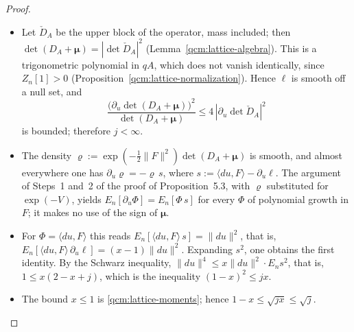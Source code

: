 \documentclass[11pt,letterpaper,reqno]{amsart}
\theoremstyle{definition}
\begin{document}
\begin{proof}
\begin{itemize}
\item[1.] Let $\check D_A$ be the upper block of the operator, mass included; then $\det(D_A+\boldsymbol\mu)=|\det\check D_A|^2$ (Lemma~\ref{qcm:lattice-algebra}).
This is a trigonometric polynomial in $qA$, which does not vanish identically, since $Z_n[1]>0$ (Proposition~\ref{qcm:lattice-normalization}).
Hence $\ell$ is smooth off a null set, and
\begin{equation*}
\frac{\bigl(\partial_u\det(D_A+\boldsymbol\mu)\bigr)^2}{\det(D_A+\boldsymbol\mu)}\le4\,|\partial_u\det\check D_A|^2
\end{equation*}
is bounded; therefore $j<\infty$.
\item[2.] The density $\varrho:=\exp(-\frac12\|F\|^2)\det(D_A+\boldsymbol\mu)$ is smooth, and almost everywhere one has $\partial_u\varrho=-\varrho\,s$, where $s:=\langle du,F\rangle-\partial_u\ell$.
The argument of Steps~1 and~2 of the proof of Proposition~5.3, with $\varrho$ substituted for $\exp(-V)$, yields $E_n[\partial_u\Phi]=E_n[\Phi\,s]$ for every $\Phi$ of polynomial growth in $F$; it makes no use of the sign of $\boldsymbol\mu$.
\item[3.] For $\Phi=\langle du,F\rangle$ this reads $E_n[\langle du,F\rangle\,s]=\|du\|^2$, that is, $E_n[\langle du,F\rangle\,\partial_u\ell]=(x-1)\|du\|^2$.
Expanding $s^2$, one obtains the first identity.
By the Schwarz inequality, $\|du\|^4\le x\|du\|^2\cdot E_ns^2$, that is, $1\le x(2-x+j)$, which is the inequality $(1-x)^2\le jx$.
\item[4.] The bound $x\le1$ is \eqref{qcm:lattice-moments}; hence $1-x\le\sqrt{jx}\le\sqrt j$.
\qedhere
\end{itemize}
\end{proof}
\end{document}
